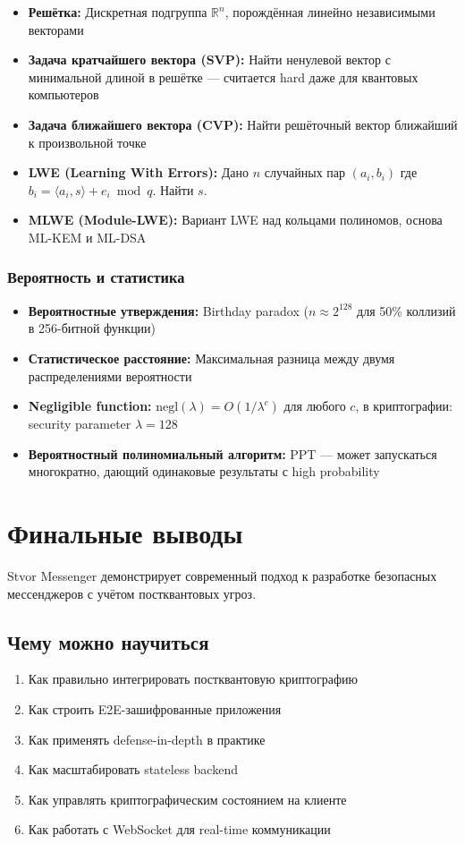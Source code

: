 \documentclass[11pt,a4paper,oneside]{book}
\begin{document}
\begin{itemize}
  \item \textbf{Решётка:} Дискретная подгруппа $\mathbb{R}^n$, порождённая линейно независимыми векторами
  \item \textbf{Задача кратчайшего вектора (SVP):} Найти ненулевой вектор с минимальной длиной в решётке — считается hard даже для квантовых компьютеров
  \item \textbf{Задача ближайшего вектора (CVP):} Найти решёточный вектор ближайший к произвольной точке
  \item \textbf{LWE (Learning With Errors):} Дано $n$ случайных пар $(a_i, b_i)$ где $b_i = \langle a_i, s \rangle + e_i \bmod q$. Найти $s$.
  \item \textbf{MLWE (Module-LWE):} Вариант LWE над кольцами полиномов, основа ML-KEM и ML-DSA
\end{itemize}
\vspace{-0.2cm}\subsection{Вероятность и статистика}
\begin{itemize}
  \item \textbf{Вероятностные утверждения:} Birthday paradox ($n \approx 2^{128}$ для 50\% коллизий в 256-битной функции)
  \item \textbf{Статистическое расстояние:} Максимальная разница между двумя распределениями вероятности
  \item \textbf{Negligible function:} $\text{negl}(\lambda) = O(1/\lambda^c)$ для любого $c$, в криптографии: security parameter $\lambda = 128$
  \item \textbf{Вероятностный полиномиальный алгоритм:} PPT — может запускаться многократно, дающий одинаковые результаты с high probability
\end{itemize}
\vspace{-0.5cm}\chapter{Финальные выводы}
Stvor Messenger демонстрирует современный подход к разработке безопасных мессенджеров с учётом постквантовых угроз.
\vspace{-0.3cm}\section{Чему можно научиться}
\begin{enumerate}
  \item Как правильно интегрировать постквантовую криптографию
  \item Как строить E2E-зашифрованные приложения
  \item Как применять defense-in-depth в практике
  \item Как масштабировать stateless backend
  \item Как управлять криптографическим состоянием на клиенте
  \item Как работать с WebSocket для real-time коммуникации
\end{enumerate}
\end{document}
